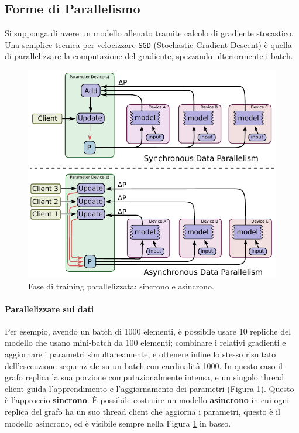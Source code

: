 \documentclass[DIV=calc, paper=a4, fontsize=11pt]{scrartcl}	 %
\begin{document}
\begin{multicols}{2}
		\section{Forme di Parallelismo}
			Si supponga di avere un modello allenato tramite calcolo di gradiente stocastico. Una semplice tecnica per velocizzare \texttt{SGD} (Stochastic Gradient Descent) è quella di parallelizzare la computazione del gradiente, spezzando ulteriormente i batch. 
			\begin{figure}[H]
				\centering
				\includegraphics[scale=.45]{img/sync-async.png}
				\caption{Fase di training parallelizzata: sincrono e asincrono.}
				\label{fig:syncr-asyncr}
			\end{figure}
			\paragraph*{Parallelizzare sui dati} Per esempio, avendo un batch di 1000 elementi, è possibile usare 10 repliche del modello che usano mini-batch da 100 elementi; combinare i relativi gradienti e aggiornare i parametri simultaneamente, e ottenere infine lo stesso risultato dell'esecuzione sequenziale su un batch con cardinalità 1000. In questo caso il grafo replica la sua porzione computazionalmente intensa, e un singolo thread client guida l'apprendimento e l'aggiornamento dei parametri (Figura \ref{fig:syncr-asyncr}). Questo è l'approccio \textbf{sincrono}.
			È possibile costruire un modello \textbf{asincrono} in cui ogni replica del grafo ha un suo thread client che aggiorna i parametri, questo è il modello asincrono, ed è visibile sempre nella Figura \ref{fig:syncr-asyncr} in basso.

\end{multicols}
\end{document}
